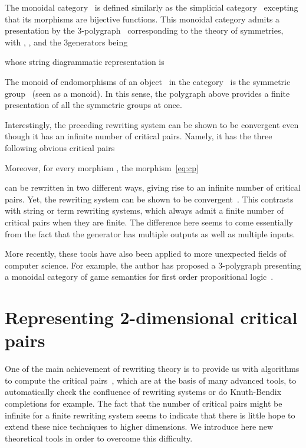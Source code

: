\documentclass{LMCS}
\begin{document}
\begin{exa}
  \label{ex:pres-bij}
  The monoidal category~ is defined similarly as the simplicial
  category~ excepting that its morphisms are bijective functions. This
  monoidal category admits a presentation by the 3-polygraph~ corresponding
  to the theory of symmetries, with \hbox{}, ,
\hbox{} and the 3\nbd{}generators being
  
  whose string diagrammatic representation is
  
  The monoid of endomorphisms of an object~ in the category~ is the
  symmetric group~ (seen as a monoid). In this sense, the
  polygraph above provides a finite presentation of all the symmetric groups at
  once.
\end{exa}

Interestingly, the preceding rewriting system can be shown to be convergent
even though it has an infinite number of critical pairs. Namely, it has the
three following obvious critical pairs

Moreover, for every morphism , the morphism~\eqref{eq:cp}

can be rewritten in two different ways, giving rise to an infinite number of
critical pairs. Yet, the rewriting system can be shown to be
convergent~\cite{lafont:boolean-circuits}. This contrasts with string or term
rewriting systems, which always admit a finite number of critical pairs when
they are finite. The difference here seems to come essentially from the fact
that the generator  has multiple outputs as well as multiple inputs.

\bigskip

More recently, these tools have also been applied to more unexpected fields of
computer science. For example, the author has proposed a 3-polygraph presenting
a monoidal category of game semantics for first order propositional
logic~\cite{mimram:first-order-causality}.

\section{Representing 2-dimensional critical pairs}
\label{sec:repr-2-cp}
One of the main achievement of rewriting theory is to provide us with algorithms
to compute the critical pairs~\cite{baader-nipkow:trat}, which are at the basis
of many advanced tools, to automatically check the confluence of rewriting
systems or do Knuth-Bendix completions for example. The fact that the number of
critical pairs might be infinite for a finite rewriting system seems to indicate
that there is little hope to extend these nice techniques to higher
dimensions. We introduce here new theoretical tools in order to overcome this
difficulty.
\end{document}
